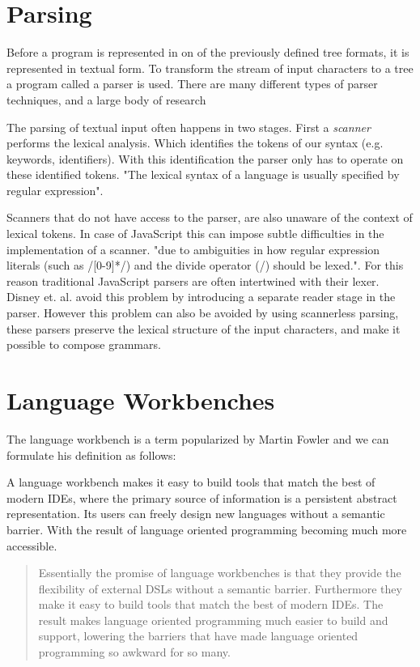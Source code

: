 \section{Parsing}
Before a program is represented in on of the previously defined tree formats, it is represented in textual form. To transform the stream of input characters to a tree a program called a parser is used. There are many different types of parser techniques, and a large body of research\cite{Visser1997,Brand2002,Salomon1989}

The parsing of textual input often happens in two stages. First a \textit{scanner} performs the lexical analysis. Which identifies the tokens of our syntax (e.g. keywords, identifiers). With this identification the parser only has to operate on these identified tokens. "The lexical syntax of a language is usually specified by regular expression"\cite{Bravenboer2004}.

Scanners that do not have access to the parser, are also unaware of the context of lexical tokens. In case of JavaScript this can impose subtle difficulties in the implementation of a scanner. "due to ambiguities in how regular expression literals (such as /[0-9]*/) and the divide operator (/) should be lexed."\cite{Disney2014}. For this reason traditional JavaScript parsers are often intertwined with their lexer. Disney et. al. avoid this problem by introducing a separate reader stage in the parser. However this problem can also be avoided by using scannerless parsing, these parsers preserve the lexical structure of the input characters, and make it possible to compose grammars\cite{Visser1997}.  

\section{Language Workbenches} \label{rascal}

The language workbench is a term popularized by Martin Fowler and we can formulate his definition as follows:

A language workbench makes it easy to build tools that match the best of modern IDEs, where the primary source of information is a persistent abstract representation. Its users can freely design new languages without a semantic barrier. With the result of language oriented programming becoming much more accessible.\cite{Fowler2005}

\blockquote[\cite{Fowler2005}]{Essentially the promise of language workbenches is that they provide the flexibility of external DSLs without a semantic barrier. Furthermore they make it easy to build tools that match the best of modern IDEs. The result makes language oriented programming much easier to build and support, lowering the barriers that have made language oriented programming so awkward for so many.}

